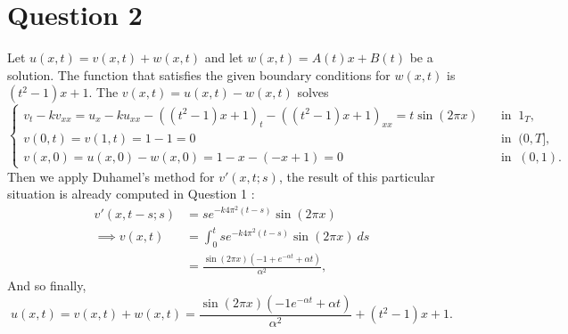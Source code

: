 \documentclass[
	12pt,
	]{article}
\theoremstyle{definition}
\theoremstyle{definition}
\theoremstyle{definition}
\theoremstyle{definition}
\theoremstyle{definition}
\theoremstyle{example}
\theoremstyle{note}
\theoremstyle{remark}
\theoremstyle{example}
\begin{document}
		\section*{Question 2}
			Let $u(x,t) = v(x,t) + w(x,t)$ and let $w(x,t) = A(t) x + B(t)$ be a solution. The function that satisfies the given boundary conditions for $w(x,t) $ is $(t^{2} -1 )x + 1$. The $v(x,t) = u(x,t) - w(x,t)$ solves
			$$ \begin{cases}
				v_{t} -kv_{xx} = u_{x} - ku_{xx} - ((t^{2} -1)x +1)_{t} - ((t^{2} -1)x +1)_{xx} = t \sin (2 \pi x) \quad &\text{in } \ 1_{T},\\
				v(0,t) = v(1,t) = 1-1 =0 \qquad &\text{in } \ (0,T], \\ 
				v(x,0) = u(x,0) - w(x,0) = 1-x - (-x+1) = 0 \qquad &\text{in } \ (0,1).
			\end{cases}$$
			Then we apply Duhamel's method for $v'(x,t;s)$, the result of this particular situation is already computed in Question 1 : 
			\begin{align*}
				v'(x,t-s;s) &= s e^{-k 4 \pi^{2} (t-s)} \sin (2\pi x) \\
				\implies v(x,t) &= \int_{0}^{t} s e^{-k 4 \pi^{2} (t-s)} \sin (2\pi x) \ ds \\
				&= \frac{\sin(2 \pi x)(-1+ e^{-\alpha t} + \alpha t )}{\alpha^{2}},
			\end{align*} 
			And so finally, 
			$$ u(x,t) = v(x,t) + w(x,t) = \frac{\sin(2 \pi x)(-1 e^{-\alpha t} + \alpha t )}{\alpha^{2}} + (t^{2} -1 )x + 1.$$
\end{document}
